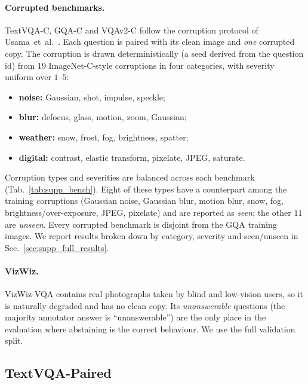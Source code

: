 \paragraph{Corrupted benchmarks.}
TextVQA-C, GQA-C and VQAv2-C follow the corruption protocol of
Usama~et~al.~\cite{usama2025analysing}. Each question is paired with its clean image
and \emph{one} corrupted copy. The corruption is drawn deterministically (a seed derived
from the question id) from $19$ ImageNet-C-style corruptions in four categories, with
severity uniform over $1$--$5$:
\begin{itemize}\itemsep0pt
  \item \textbf{noise:} Gaussian, shot, impulse, speckle;
  \item \textbf{blur:} defocus, glass, motion, zoom, Gaussian;
  \item \textbf{weather:} snow, frost, fog, brightness, spatter;
  \item \textbf{digital:} contrast, elastic transform, pixelate, JPEG, saturate.
\end{itemize}
Corruption types and severities are balanced across each benchmark (Tab.~\ref{tab:supp_bench}).
Eight of these types have a counterpart among the training corruptions (Gaussian noise,
Gaussian blur, motion blur, snow, fog, brightness/over-exposure, JPEG, pixelate) and are
reported as \emph{seen}; the other $11$ are \emph{unseen}. Every corrupted benchmark is
disjoint from the GQA training images. We report results broken down by category,
severity and seen/unseen in Sec.~\ref{sec:supp_full_results}.

\paragraph{VizWiz.}
VizWiz-VQA contains real photographs taken by blind and low-vision users, so it is
naturally degraded and has no clean copy. Its \emph{unanswerable} questions (the
majority annotator answer is ``unanswerable'') are the only place in the evaluation where
abstaining is the correct behaviour. We use the full validation split.

\subsection{TextVQA-Paired}
\label{sec:supp_eval_paired}

